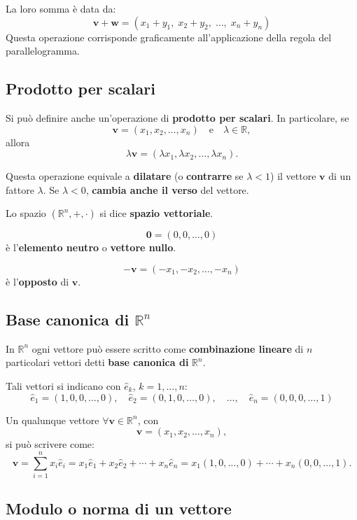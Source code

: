 La loro somma è data da:
\[
\mathbf{v} + \mathbf{w} = (x_1 + y_1, \; x_2 + y_2, \; \ldots, \; x_n + y_n)
\]
Questa operazione corrisponde graficamente all’applicazione della regola del parallelogramma.


\subsection{Prodotto per scalari}

Si può definire anche un’operazione di \textbf{prodotto per scalari}.  
In particolare, se 
\[
\mathbf{v} = (x_1, x_2, \ldots, x_n) \quad \text{e} \quad \lambda \in \mathbb{R},
\]
allora
\[
\lambda \mathbf{v} = (\lambda x_1, \lambda x_2, \ldots, \lambda x_n).
\]

Questa operazione equivale a \textbf{dilatare} (o \textbf{contrarre} se $\lambda < 1$) il vettore $\mathbf{v}$ di un fattore $\lambda$.  
Se $\lambda < 0$, \textbf{cambia anche il verso} del vettore.

Lo spazio $(\mathbb{R}^n, +, \cdot)$ si dice \textbf{spazio vettoriale}.  

\[
\mathbf{0} = (0, 0, \ldots, 0)
\]
è l’\textbf{elemento neutro} o \textbf{vettore nullo}.

\[
-\mathbf{v} = (-x_1, -x_2, \ldots, -x_n)
\]
è l’\textbf{opposto} di $\mathbf{v}$.

\subsection{Base canonica di $\mathbb{R}^n$}

In $\mathbb{R}^n$ ogni vettore può essere scritto come \textbf{combinazione lineare} di $n$ particolari vettori detti \textbf{base canonica di} $\mathbb{R}^n$.

Tali vettori si indicano con $\hat{e}_k$, $k = 1, \ldots, n$:
\[
\hat{e}_1 = (1, 0, 0, \ldots, 0), \quad 
\hat{e}_2 = (0, 1, 0, \ldots, 0), \quad 
\ldots, \quad 
\hat{e}_n = (0, 0, 0, \ldots, 1)
\]

Un qualunque vettore $\forall \mathbf{v} \in \mathbb{R}^n$, con 
\[
\mathbf{v} = (x_1, x_2, \ldots, x_n),
\]
si può scrivere come:
\[
\mathbf{v} = \sum_{i=1}^{n} x_i \hat{e}_i = 
x_1 \hat{e}_1 + x_2 \hat{e}_2 + \cdots + x_n \hat{e}_n =
x_1(1, 0, \ldots, 0) + \cdots + x_n(0, 0, \ldots, 1).
\]

\subsection{Modulo o norma di un vettore}

